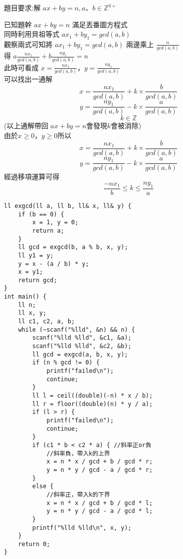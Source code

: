 題目要求:解 $ax+by=n, a、b \in \mathbb{Z}^{0+}$

已知題幹 $ax+by=n$ 滿足丟番圖方程式\\
同時利用貝祖等式 $ax_1 + by_1 = gcd(a, b)$\\
觀察兩式可知將 $ax_1 + by_1 = gcd(a, b)$ 兩邊乘上 $\frac{n}{gcd(a, b)}$\\
得 $a\frac{nx_1}{gcd(a, b)} + b\frac{ny_1}{gcd(a, b)} = n$\\
此時可看成 $x = \frac{nx_1}{gcd(a, b)}$，$y = \frac{ny_1}{gcd(a, b)}$\\
可以找出一通解\\
$$x = \frac{nx_1}{gcd(a, b)} + k \times \frac{b}{gcd(a, b)}$$
$$y = \frac{ny_1}{gcd(a, b)} - k \times \frac{a}{gcd(a, b)}$$
$$k \in \mathbb{Z}$$
(以上通解帶回 $ax + by = n$會發現$k$會被消除)\\
$由於x \geq 0，y \geq 0$所以
$$x = \frac{nx_1}{gcd(a, b)} + k \times \frac{b}{gcd(a, b)}$$
$$y = \frac{ny_1}{gcd(a, b)} - k \times \frac{a}{gcd(a, b)}$$
經過移項運算可得
$$\frac{-nx_1}{b} \leq k \leq \frac{ny_1}{a}$$
\begin{lstlisting}
ll exgcd(ll a, ll b, ll& x, ll& y) {
    if (b == 0) {
        x = 1, y = 0;
        return a;
    }
    ll gcd = exgcd(b, a % b, x, y);
    ll y1 = y;
    y = x - (a / b) * y;
    x = y1;
    return gcd;
}
int main() {
    ll n;
    ll x, y;
    ll c1, c2, a, b;
    while (~scanf("%lld", &n) && n) {
        scanf("%lld %lld", &c1, &a);
        scanf("%lld %lld", &c2, &b);
        ll gcd = exgcd(a, b, x, y);
        if (n % gcd != 0) {
            printf("failed\n");
            continue;
        }
        ll l = ceil((double)(-n) * x / b);
        ll r = floor((double)(n) * y / a);
        if (l > r) {
            printf("failed\n");
            continue;
        }
        if (c1 * b < c2 * a) { //斜率正or負
            //斜率負，帶入k的上界
            x = n * x / gcd + b / gcd * r;
            y = n * y / gcd - a / gcd * r;
        }
        else {
            //斜率正，帶入k的下界
            x = n * x / gcd + b / gcd * l;
            y = n * y / gcd - a / gcd * l;
        }
        printf("%lld %lld\n", x, y);
    }
    return 0;
}
\end{lstlisting}